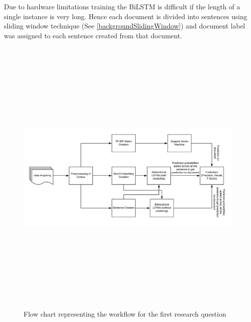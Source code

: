 Due to hardware limitations training the \gls{BiLSTM} is difficult if the length of a single instance is very long. Hence each document is divided into sentences using sliding window technique (See \ref{backgroundSlidingWindow}) and document label was assigned to each sentence created from that document. 

\begin{figure}[!ht]
    \centering
    \includegraphics[width=15cm, height=14cm,keepaspectratio]{pics/flowforQuestion1.jpeg}
    \captionsetup{justification=centering,margin=1cm}
    \caption{Flow chart representing the workflow for the first research question }
    \label{fig:FlowResearchQuestion1}
\end{figure}

